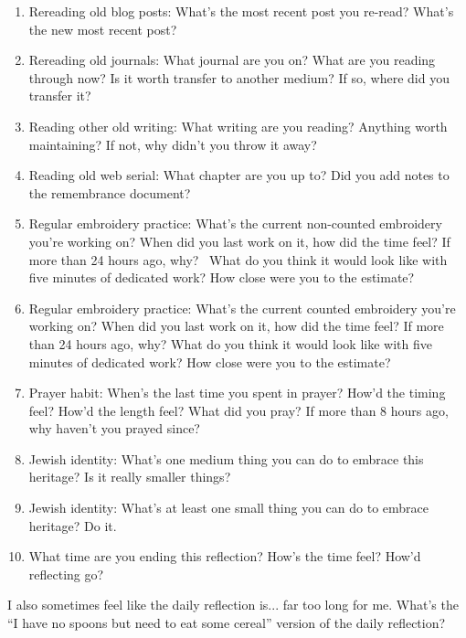 \documentclass[12pt]{article}
\newcommand{\say}[1]{``#1''}
\renewcommand{\,}{\textsuperscript{,}}
\begin{document}
\begin{enumerate}
\item Rereading old blog posts: What's the most recent post you re-read? What's the new most recent post?

\item Rereading old journals: What journal are you on? What are you reading through now? Is it worth transfer to another medium? If so, where did you transfer it?

\item Reading other old writing: What writing are you reading? Anything worth maintaining? If not, why didn't you throw it away?

\item Reading old web serial: What chapter are you up to? Did you add notes to the remembrance document?

\item Regular embroidery practice: What's the current non-counted embroidery you're working on? When did you last work on it, how did the time feel? If more than 24 hours ago, why?  What do you think it would look like with five minutes of dedicated work? How close were you to the estimate?

\item Regular embroidery practice: What's the current counted embroidery you're working on? When did you last work on it, how did the time feel? If more than 24 hours ago, why? What do you think it would look like with five minutes of dedicated work? How close were you to the estimate?

\item Prayer habit: When's the last time you spent in prayer? How'd the timing feel? How'd the length feel? What did you pray? If more than 8 hours ago, why haven't you prayed since?

\item Jewish identity: What's one medium thing you can do to embrace this heritage? Is it really smaller things?

\item Jewish identity: What's at least one small thing you can do to embrace heritage? Do it.

\item What time are you ending this reflection? How's the time feel? How'd reflecting go?

\end{enumerate}

I also sometimes feel like the daily reflection is... far too long for me.  
What's the \say{I have no spoons but need to eat some cereal} version of the daily reflection?
\end{document}
